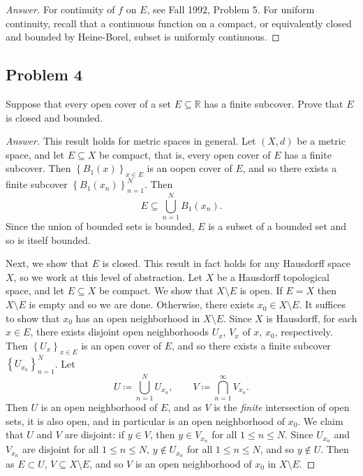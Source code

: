 \documentclass[12pt]{article}
\newcommand{\real}{\mathbb{R}}
\newcommand{\ita}[1]{\textit{#1}}
\newcommand\paren[1]{\left( #1 \right)}
\newcommand\setb[1]{\left \{ #1 \right \}}
\theoremstyle{definition}
\begin{document}
\begin{proof}[Answer]
    For continuity of $f$ on $E$, see Fall 1992, Problem 5. For uniform continuity, recall that a continuous function on a compact, or equivalently closed and bounded by Heine-Borel, subset is uniformly continuous. 
\end{proof}

\subsection{Problem 4 \texorpdfstring{\cite{Munkres}}{}}
Suppose that every open cover of a set $E \subseteq \real$ has a finite subcover. Prove that $E$ is closed and bounded. 

\begin{proof}[Answer]
    This result holds for metric spaces in general. Let $(X,d)$ be a metric space, and let $E \subseteq X$ be compact, that is, every open cover of $E$ has a finite subcover. Then $\setb{ B_1(x) }_{x \in E}$ is an oopen cover of $E$, and so there exists a finite subcover $\setb{ B_1 \paren{ x_n } }_{n = 1}^N$. Then 
    \[
        E \subseteq \bigcup\limits_{n = 1}^N B_1 \paren{ x_n } .
    \]
    Since the union of bounded sets is bounded, $E$ is a subset of a bounded set and so is itself bounded. 
    
    Next, we show that $E$ is closed. This result in fact holds for any Hausdorff space $X$, so we work at this level of abstraction. Let $X$ be a Hausdorff topological space, and let $E \subseteq X$ be compact. We show that $X \setminus E$ is open. If $E = X$ then $X \setminus E$ is empty and so we are done. Otherwise, there exists $x_0 \in X \setminus E$. It suffices to show that $x_0$ has an open neighborhood in $X \setminus E$. Since $X$ is Hausdorff, for each $x \in E$, there exists disjoint open neighborhoods $U_x$, $V_x$ of $x$, $x_0$, respectively. Then $\setb{ U_x }_{x \in E}$ is an open cover of $E$, and so there exists a finite subcover $\setb{ U_{x_n} }_{n = 1}^N$. Let 
    \[
        U \coloneqq \bigcup\limits_{n = 1}^N U_{x_n} , \qquad V \coloneqq \bigcap\limits_{n = 1}^{\infty} V_{x_n} . 
    \]
    Then $U$ is an open neighborhood of $E$, and as $V$ is the \ita{finite} intersection of open sets, it is also open, and in particular is an open neighborhood of $x_0$. We claim that $U$ and $V$ are disjoint: if $y \in V$, then $y \in V_{x_n}$ for all $1 \leq n \leq N$. Since $U_{x_n}$ and $V_{x_n}$ are disjoint for all $1 \leq n \leq N$, $y \notin U_{x_n}$ for all $1 \leq n \leq N$, and so $y \notin U$. Then as $E \subset U$, $V \subseteq X \setminus E$, and so $V$ is an open neighborhood of $x_0$ in $X \setminus E$. 
\end{proof}
\end{document}
